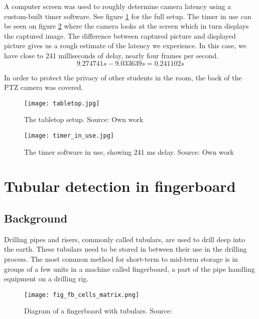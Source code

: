 A computer screen was used to roughly determine camera latency using a custom-built timer software. See figure \ref{fig:tabletop} for the full setup. The timer in use can be seen on figure \ref{fig:timer_in_use} where the camera looks at the screen which in turn displays the captured image. The difference between captured picture and displayed picture gives us a rough estimate of the latency we experience. In this case, we have close to 241 milliseconds of delay, nearly four frames per second.
\begin{equation}
9.274741s - 9.033639s = 0.241102s
\end{equation}

In order to protect the privacy of other students in the room, the back of the PTZ camera was covered.

\begin{figure}[ht]
    \centering
    \texttt{[image: tabletop.jpg]}
    \caption{The tabletop setup. Source: Own work}
    \label{fig:tabletop}
\end{figure}

\begin{figure}[ht]
    \centering
    \texttt{[image: timer\_in\_use.jpg]}
    \caption{The timer software in use, showing 241 ms delay. Source: Own work}
    \label{fig:timer_in_use}
\end{figure}


\section{Tubular detection in fingerboard}
\subsection{Background}
Drilling pipes and risers, commonly called tubulars, are used to drill deep into the earth. These tubulars need to be stored in between their use in the drilling process. The most common method for short-term to mid-term storage is in groups of a few units in a machine called fingerboard, a part of the pipe handling equipment on a drilling rig.

\begin{figure}[ht]
    \centering
    \texttt{[image: fig\_fb\_cells\_matrix.png]}
    \caption{Diagram of a fingerboard with tubulars. Source:\cite{fig_fb_cells_matrix13}}
    \label{fig:fb_cells_matrix}
\end{figure}
\FloatBarrier

